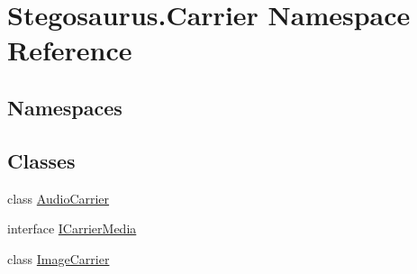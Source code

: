 \hypertarget{namespace_stegosaurus_1_1_carrier}{}\section{Stegosaurus.\+Carrier Namespace Reference}
\label{namespace_stegosaurus_1_1_carrier}
\subsection*{Namespaces}
\begin{DoxyCompactItemize}
\end{DoxyCompactItemize}
\subsection*{Classes}
\begin{DoxyCompactItemize}
\item 
class \hyperlink{class_stegosaurus_1_1_carrier_1_1_audio_carrier}{Audio\+Carrier}
\item 
interface \hyperlink{interface_stegosaurus_1_1_carrier_1_1_i_carrier_media}{I\+Carrier\+Media}
\item 
class \hyperlink{class_stegosaurus_1_1_carrier_1_1_image_carrier}{Image\+Carrier}
\end{DoxyCompactItemize}
